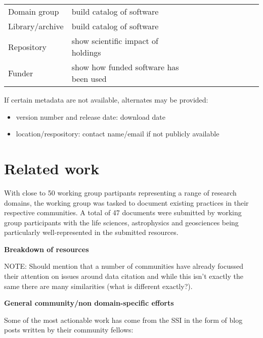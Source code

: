 \documentclass[11pt, oneside]{amsart}
\begin{document}
\begin{table}[htbp]
\begin{tabular}{@{}l l c c c c c c c c@{}}
Domain group & build catalog of software 			& \textbullet & \textbullet & \textbullet & \textbullet & \textbullet & \textbullet &  & \\
Library\slash archive & build catalog of software 	& \textbullet & \textbullet & \textbullet & \textbullet & \textbullet & \textbullet &  & \\
Repository & show scientific impact of holdings 	& \textbullet &   &   &   &   & \textbullet & \textbullet & \\
Funder & show how funded software has been used		& \textbullet &   &   &   &   & \textbullet & \textbullet & \\
\bottomrule
\end{tabular}
\label{tab:use_cases}
\end{table}%

If certain metadata are not available, alternates may be provided:
\begin{itemize}
\item version number and release date: download date
\item location\slash respository: contact name\slash email if not publicly available
\end{itemize}




\section{Related work}
\label{sec:related_work}

With close to 50 working group partipants representing a range of research domains, the working group was tasked to
document existing practices in their respective communities. A total of 47 documents were submitted by working group
participants with the life sciences, astrophysics and geosciences being particularly well-represented in the submitted
resources.

\textbf{Breakdown of resources}

NOTE: Should mention that a number of communities have already focussed their attention on issues around data citation and while
this isn't exactly the same there are many similarities (what is different exactly?).

\textbf{General community/non domain-specific efforts}

Some of the most actionable work has come from the SSI in the form of blog posts written by their community fellows:
\end{document}
